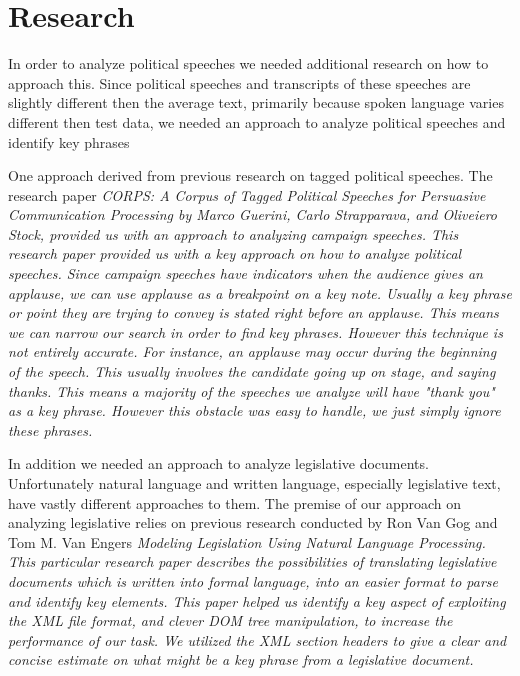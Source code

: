 \documentclass[12pt]{article}
\begin{document}
\section{Research}
\par{In order to analyze political speeches we needed additional research on how to approach this. Since political speeches and transcripts of these speeches are slightly different then the average text, primarily because spoken language varies different then test data, we needed an approach to analyze political speeches and identify key phrases}
\par{One approach derived from previous research on tagged political speeches. The research paper \it{CORPS: A Corpus of Tagged Political Speeches for Persuasive Communication Processing} by Marco Guerini, Carlo Strapparava, and Oliveiero Stock, provided us with an approach to analyzing campaign speeches. This research paper provided us with a key approach on how to analyze political speeches. Since campaign speeches have indicators when the audience gives an applause, we can use applause as a breakpoint on a key note. Usually a key phrase or point they are trying to convey is stated right before an applause. This means we can narrow our search in order to find key phrases. However this technique is not entirely accurate. For instance, an applause may occur during the beginning of the speech. This usually involves the candidate going up on stage, and saying thanks. This means a majority of the speeches we analyze will have "thank you" as a key phrase. However this obstacle was easy to handle, we just simply ignore these phrases.  }
\par{In addition we needed an approach to analyze legislative documents. Unfortunately natural language and written language, especially legislative text, have vastly different approaches to them. The premise of our approach on analyzing legislative relies on previous research conducted by Ron Van Gog and Tom M. Van Engers \it{Modeling Legislation Using Natural Language Processing.} This particular research paper describes the possibilities of translating legislative documents which is written into formal language, into an easier format to parse and identify key elements. This paper helped us identify a key aspect of exploiting the XML file format, and clever DOM tree manipulation, to increase the performance of our task. We utilized the XML section headers to give a clear and concise estimate on what might be a key phrase from a legislative document.}
\end{document}
